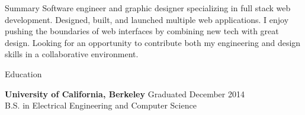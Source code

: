 \documentclass{resume} %
\begin{document}
\begin{rSection}{Summary}
Software engineer and graphic designer specializing in full stack web development. Designed, built, and launched multiple web applications. I enjoy pushing the boundaries of web interfaces by combining new tech with great design. Looking for an opportunity to contribute both my engineering and design skills in a collaborative environment.
\end{rSection}

\begin{rSection}{Education}

{\bf University of California, Berkeley} \hfill {Graduated December 2014} \\
B.S. in Electrical Engineering and Computer Science

\end{rSection}
\end{document}
